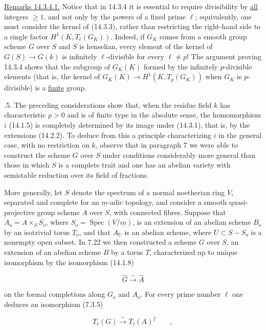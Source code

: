 \medskip
\noindent
\underline{Remarks 14.3.4.1.}  Notice that in 14.3.4 it is essential
to require divisibility by \underline{all} integers $\geq1$, and not
only by the powers of a fixed prime $\ell$; equivalently, one must
consider the kernel of (14.3.3), rather than restricting the right-hand
side to a single factor $H^1(K,T_\ell(G_K))$.  Indeed, if $G_K$ comes
from a smooth group scheme $G$ over $S$ and $S$ is henselian, every
element of the kernel of $G(S)\longrightarrow G(k)$ is infinitely
$\ell$-divisible for every $\ell\neq p$!  The argument proving 14.3.4
shows that the subgroup of $G_K(K)$ formed by the infinitely
$p$-divisible elements (that is, the kernel of
$G_K(K)\longrightarrow H^1(K,T_p(G_K))$ when $G_K$ is $p$-divisible)
is a \underline{finite} group.

\medskip
{}.5. The preceding considerations show that, when the residue
field $k$ has characteristic $p>0$ and is of finite type in the
absolute sense, the homomorphism $i$ (14.1.5) is completely determined
by its image under (14.3.1), that is, by the extensions (14.2.2).  To
deduce from this a principle characterizing $i$ in the general case,
with no restriction on $k$, observe that in paragraph 7 we were able to
construct the scheme $G$ over $S$ under conditions considerably more
general than those in which $S$ is a complete trait and one has an
abelian variety with semistable reduction over its field of fractions.

More generally, let $S$ denote the spectrum of a normal noetherian ring
$V$, separated and complete for an $\underline m$-adic topology, and
consider a smooth quasi-projective group scheme $A$ over $S$, with
connected fibres.  Suppose that
$A_o=A\times_S S_o$, where
$S_o=\operatorname{Spec}(V/\underline m)$, is an extension of an
abelian scheme $B_o$ by an isotrivial torus $T_o$, and that $A_U$ is an
abelian scheme, where $U\subset S-S_o$ is a nonempty open subset.  In
7.22 we then constructed a scheme $G$ over $S$, an extension of an
abelian scheme $B$ by a torus $T$, characterized up to unique
isomorphism by the isomorphism (14.1.8)

\begin{equation}\tag{14.3.5.1}
 \hat G\xrightarrow{\ \sim\ }\hat A
\end{equation}

\noindent
on the formal completions along $G_o$ and $A_o$.  For every prime
number $\ell$ one deduces an isomorphism (7.3.5)

\begin{equation}\tag{14.3.5.2}
 T_\ell(G)\xrightarrow{\ \sim\ }T_\ell(A)^f\qquad ,
\end{equation}

